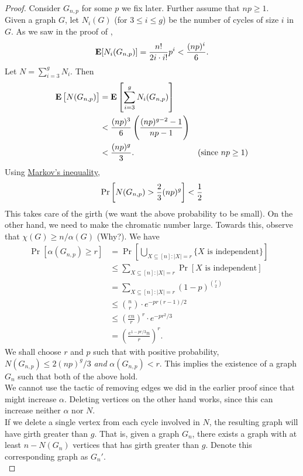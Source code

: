 			\begin{proof}
				Consider $G_{n,p}$ for some $p$ we fix later. Further assume that $np \ge 1$.\\%
				Given a graph $G$, let $N_i(G)$ (for $3 \le i \le g$) be the number of cycles of size $i$ in $G$. As we saw in the proof of ,
				\[ \textbf{E}[N_i(G_{n,p})] = \frac{n!}{2i \cdot i!} p^i < \frac{(np)^i}{6}. \]
				Let $N = \sum_{i=3}^g N_i$. Then
				\begin{align*}
					\textbf{E}\left[N(G_{n,p})\right] &= \textbf{E}\left[\sum_{i=3}^g N_i(G_{n,p})\right] \\
					&< \frac{(np)^3}{6} \left(\frac{(np)^{g-2} - 1}{np - 1}\right) \\
					&< \frac{(np)^g}{3}. & \text{(since $np\ge 1$)}
				\end{align*}
				Using \href{https://en.wikipedia.org/wiki/Markov%27s_inequality}{Markov's inequality},
				\begin{equation}
					\label{eqn: 2.5}
					\Pr\left[ N(G_{n,p}) > \frac{2}{3} (np)^g \right] < \frac{1}{2} \\
				\end{equation}
				This takes care of the girth (we want the above probability to be small).
				On the other hand, we need to make the chromatic number large. Towards this, observe that $\chi(G) \ge n/\alpha(G)$ (Why?). %
				We have
				\begin{align*}
					\Pr\left[\alpha(G_{n,p}) \ge r\right] &= \Pr\left[ \bigcup_{X\subseteq [n]: |X|=r} \{X\text{ is independent}\} \right] \\
					&\le \sum_{X \subseteq [n] : |X|=r} \Pr[X\text{ is independent}] & \\%
					&= \sum_{X \subseteq [n] : |X|=r} (1-p)^{\binom{r}{2}} \\
					&\le \binom{n}{r} \cdot e^{-pr(r-1)/2} \\
					&\le \left(\frac{en}{r}\right)^r \cdot e^{-pr^2/3} \\
					&= \left(\frac{e^{1-pr/3}n}{r}\right)^r.
				\end{align*}
				We shall choose $r$ and $p$ such that with positive probability, $N(G_{n,p}) \le 2(np)^g/3$ \emph{and} $\alpha(G_{n,p}) < r$. This implies the existence of a graph $G_n$ such that both of the above hold.\\
				We cannot use the tactic of removing edges we did in the earlier proof since that might increase $\alpha$. Deleting vertices on the other hand works, since this can increase neither $\alpha$ nor $N$.\\
				If we delete a single vertex from each cycle involved in $N$, the resulting graph will have girth greater than $g$. That is, given a graph $G_n$, there exists a graph with at least $n - N(G_n)$ vertices that has girth greater than $g$. Denote this corresponding graph as $G_n'$.\\


\end{proof}
